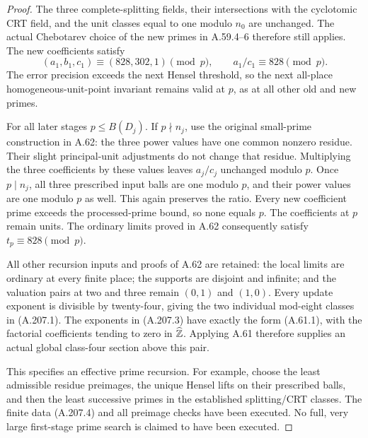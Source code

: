 \begin{proof}
The three complete-splitting fields, their intersections with
the cyclotomic CRT field, and the unit classes equal to one
modulo \(n_0\) are unchanged.  The actual Chebotarev choice
of the new primes in A.59.4--6 therefore still applies.
The new coefficients satisfy
\[
       (a_1,b_1,c_1)\equiv(828,302,1)\pmod p,
                  \qquad a_1/c_1\equiv828\pmod p.
\tag{A.207.7}
\]
The error precision exceeds the next Hensel threshold, so
the next all-place homogeneous-unit-point invariant remains
valid at \(p\), as at all other old and new primes.

For all later stages \(p\le B(D_j)\).  If \(p\nmid n_j\),
use the original small-prime construction in A.62: the three
power values have one common nonzero residue.  Their slight
principal-unit adjustments do not change that residue.
Multiplying the three coefficients by these values leaves
\(a_j/c_j\) unchanged modulo \(p\).
Once \(p\mid n_j\), all three prescribed input balls are
one modulo \(p\), and their power values are one modulo
\(p\) as well.  This again preserves the ratio.
Every new coefficient prime exceeds the processed-prime bound,
so none equals \(p\).  The coefficients at \(p\) remain units.
The ordinary limits proved in A.62 consequently satisfy
\(t_p\equiv828\pmod p\).

All other recursion inputs and proofs of A.62 are retained:
the local limits are ordinary at every finite place; the
supports are disjoint and infinite; and the valuation pairs
at two and three remain \((0,1)\) and \((1,0)\).
Every update exponent is divisible by twenty-four, giving
the two individual mod-eight classes in (A.207.1).
The exponents in (A.207.3) have exactly the form (A.61.1),
with the factorial coefficients tending to zero in
\(\widehat{\mathbb Z}\).  Applying A.61 therefore supplies an actual
global class-four section above this pair.

This specifies an effective prime recursion.  For example,
choose the least admissible residue preimages, the unique
Hensel lifts on their prescribed balls, and then the least
successive primes in the established splitting/CRT classes.
The finite data (A.207.4) and all preimage checks have been
executed.  No full, very large first-stage prime search is
claimed to have been executed.


\end{proof}
